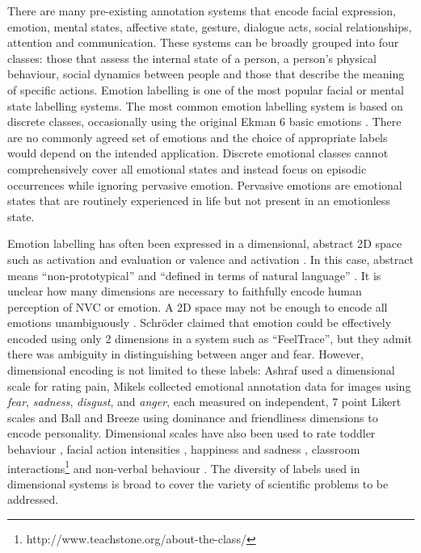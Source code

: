 There are many pre-existing annotation systems that encode facial expression, emotion, mental states, affective state, gesture, dialogue acts, social relationships, attention and communication. These systems can be broadly grouped into four classes: those that assess the internal state of a person, a person's physical behaviour, social dynamics between people and those that describe the meaning of specific actions. Emotion labelling is one of the most popular facial or mental state labelling systems. The most common emotion labelling system is based on discrete classes, occasionally using the original Ekman 6 basic emotions \cite{Cohen2000}. There are no commonly agreed set of emotions and the choice of appropriate labels would depend on the intended application. Discrete emotional classes cannot comprehensively cover all emotional states and instead focus on episodic occurrences \cite{Cowie2005} while ignoring pervasive emotion. Pervasive emotions are emotional states that are routinely experienced in life but not present in an emotionless state. 

Emotion labelling has often been expressed in a dimensional, abstract 2{D} space such as activation and evaluation \cite{Cowie2000} or valence and activation \cite{Cowie1999, Liscombe2003, McRorie2007}. In this case, abstract means ``non-prototypical'' and ``defined in terms of natural language'' \cite{Kazemzadeh2013}. It is unclear how many dimensions are necessary to faithfully encode human perception of \ac{NVC} or emotion. A 2{D} space may not be enough to encode all emotions unambiguously \cite{Fontaine2007}. Schr\"{o}der \etal claimed that emotion could be effectively encoded using only 2 dimensions \cite{Cowie2000} in a system such as ``FeelTrace'', but they admit there was ambiguity in distinguishing between anger and fear. However, dimensional encoding is not limited to these labels: Ashraf \etal \cite{Ashraf2007} used a dimensional scale for rating pain, Mikels \etal \cite{Mikels2005} collected emotional annotation data for images using \textit{fear}, \textit{sadness}, \textit{disgust}, and \textit{anger}, each measured on independent, 7 point Likert scales and Ball and Breeze \cite{Ball2000} using dominance and friendliness dimensions to encode personality. Dimensional scales have also been used to rate toddler behaviour \cite{Lorber2003}, facial action intensities \cite{Fasel2000}, happiness and sadness \cite{Hsee1992}, classroom interactions\footnote{http://www.teachstone.org/about-the-class/} and non-verbal behaviour \cite{Feldman1991}. The diversity of labels used in dimensional systems is broad to cover the variety of scientific problems to be addressed.

